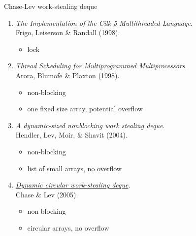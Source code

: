 \begin{frame}{Chase-Lev work-stealing deque}
\begin{enumerate}
	\item
		\textit{The Implementation of the Cilk-5 Multithreaded Language}. \\
		Frigo, Leiserson \& Randall (1998).
		\begin{itemize}
			\item lock
		\end{itemize}
	\item
		\textit{Thread Scheduling for Multiprogrammed Multiprocessors}. \\
		Arora, Blumofe \& Plaxton (1998).
		\begin{itemize}
			\item non-blocking
			\item one fixed size array, potential overflow
		\end{itemize}
	\item
		\textit{A dynamic-sized nonblocking work stealing deque}. \\
		Hendler, Lev, Moir, \& Shavit (2004).
		\begin{itemize}
			\item non-blocking
			\item list of small arrays, no overflow
		\end{itemize}
	\item
		\underline{\textit{Dynamic circular work-stealing deque}}. \\
		Chase \& Lev (2005).
		\begin{itemize}
			\item non-blocking
			\item circular arrays, no overflow
		\end{itemize}
\end{enumerate}
\end{frame}